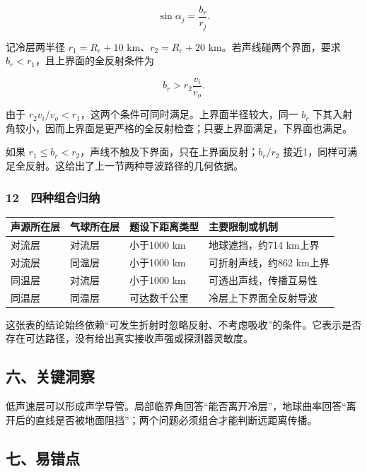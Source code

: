 \documentclass[12pt,a4paper,fontset=fandol]{ctexart}
\begin{document}
\[\sin\alpha_j=\frac{b_r}{r_j}.\]

记冷层两半径 \(r_1=R_e+10\) km、\(r_2=R_e+20\)
km。若声线碰两个界面，要求 \(b_r<r_1\)，且上界面的全反射条件为

\[b_r>r_2\frac{v_i}{v_o}.\]

由于 \(r_2v_i/v_o<r_1\)，这两个条件可同时满足。上界面半径较大，同一
\(b_r\)
下其入射角较小，因而上界面是更严格的全反射检查；只要上界面满足，下界面也满足。

如果 \(r_1\le b_r<r_2\)，声线不触及下界面，只在上界面反射；\(b_r/r_2\)
接近1，同样可满足全反射。这给出了上一节两种导波路径的几何依据。

\subsubsection{12　四种组合归纳}\label{ux56dbux79cdux7ec4ux5408ux5f52ux7eb3}

{\def\LTcaptype{table} %
\begin{longtable}[]{@{}llll@{}}
\toprule\noalign{}
声源所在层 & 气球所在层 & 题设下距离类型 & 主要限制或机制 \\
\midrule\noalign{}
\endhead
\bottomrule\noalign{}
\endlastfoot
对流层 & 对流层 & 小于1000 km & 地球遮挡，约714 km上界 \\
对流层 & 同温层 & 小于1000 km & 可折射声线，约862 km上界 \\
同温层 & 对流层 & 小于1000 km & 可透出声线，传播互易性 \\
同温层 & 同温层 & 可达数千公里 & 冷层上下界面全反射导波 \\
\end{longtable}
}

这张表的结论始终依赖``可发生折射时忽略反射、不考虑吸收''的条件。它表示是否存在可达路径，没有给出真实接收声强或探测器灵敏度。

\subsection{六、关键洞察}\label{ux516dux5173ux952eux6d1eux5bdf-6}

低声速层可以形成声学导管。局部临界角回答``能否离开冷层''，地球曲率回答``离开后的直线是否被地面阻挡''；两个问题必须组合才能判断远距离传播。

\subsection{七、易错点}\label{ux4e03ux6613ux9519ux70b9-6}
\end{document}
